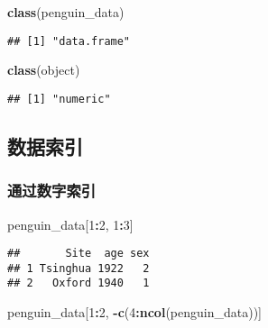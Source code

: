 \documentclass[
]{article}
\newenvironment{Shaded}{\begin{snugshade}}{\end{snugshade}}
\newcommand{\DecValTok}[1]{\textcolor[rgb]{0.00,0.00,0.81}{#1}}
\newcommand{\FunctionTok}[1]{\textcolor[rgb]{0.13,0.29,0.53}{\textbf{#1}}}
\newcommand{\NormalTok}[1]{#1}
\newcommand{\SpecialCharTok}[1]{\textcolor[rgb]{0.81,0.36,0.00}{\textbf{#1}}}
\begin{document}
\begin{Shaded}
\begin{Highlighting}[]
\FunctionTok{class}\NormalTok{(penguin\_data)}
\end{Highlighting}
\end{Shaded}

\begin{verbatim}
## [1] "data.frame"
\end{verbatim}

\begin{Shaded}
\begin{Highlighting}[]
\FunctionTok{class}\NormalTok{(object)}
\end{Highlighting}
\end{Shaded}

\begin{verbatim}
## [1] "numeric"
\end{verbatim}

\subsection{数据索引}\label{ux6570ux636eux7d22ux5f15}

\subsubsection{通过数字索引}\label{ux901aux8fc7ux6570ux5b57ux7d22ux5f15}

\begin{Shaded}
\begin{Highlighting}[]
\NormalTok{penguin\_data[}\DecValTok{1}\SpecialCharTok{:}\DecValTok{2}\NormalTok{, }\DecValTok{1}\SpecialCharTok{:}\DecValTok{3}\NormalTok{]}
\end{Highlighting}
\end{Shaded}

\begin{verbatim}
##       Site  age sex
## 1 Tsinghua 1922   2
## 2   Oxford 1940   1
\end{verbatim}

\begin{Shaded}
\begin{Highlighting}[]
\NormalTok{penguin\_data[}\DecValTok{1}\SpecialCharTok{:}\DecValTok{2}\NormalTok{, }\SpecialCharTok{{-}}\FunctionTok{c}\NormalTok{(}\DecValTok{4}\SpecialCharTok{:}\FunctionTok{ncol}\NormalTok{(penguin\_data))]}
\end{Highlighting}
\end{Shaded}
\end{document}
